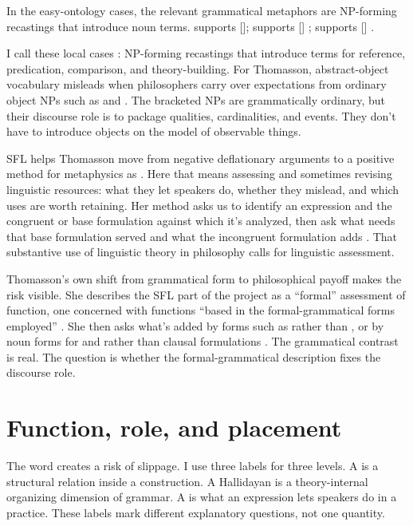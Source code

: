 \documentclass[12pt]{article}
\begin{document}
In the easy-ontology cases, the relevant grammatical metaphors are NP-forming recastings that introduce noun terms.  supports  [];  supports [] ;  supports []  \citep[169--179]{thomasson2025rethink}.

I call these local cases : NP-forming recastings that introduce terms for reference, predication, comparison, and theory-building. For Thomasson, abstract-object vocabulary misleads when philosophers carry over expectations from ordinary object NPs such as  and . The bracketed NPs are grammatically ordinary, but their discourse role is to package qualities, cardinalities, and events. They don't have to introduce objects on the model of observable things.

SFL helps Thomasson move from negative deflationary arguments to a positive method for metaphysics as . Here that means assessing and sometimes revising linguistic resources: what they let speakers do, whether they mislead, and which uses are worth retaining. Her method asks us to identify an expression and the congruent or base formulation against which it's analyzed, then ask what needs that base formulation served and what the incongruent formulation adds \citep[203--207]{thomasson2025rethink}. That substantive use of linguistic theory in philosophy calls for linguistic assessment.

Thomasson's own shift from grammatical form to philosophical payoff makes the risk visible. She describes the SFL part of the project as a \enquote{formal} assessment of function, one concerned with functions \enquote{based in the formal-grammatical forms employed} \citep[206]{thomasson2025rethink}. She then asks what's added by forms such as  rather than , or by noun forms for  and  rather than clausal formulations \citep[206--207]{thomasson2025rethink}. The grammatical contrast is real. The question is whether the formal-grammatical description fixes the discourse role.

\section{Function, role, and placement}
The word  creates a risk of slippage. I use three labels for three levels. A  is a structural relation inside a construction. A Hallidayan  is a theory-internal organizing dimension of grammar. A  is what an expression lets speakers do in a practice. These labels mark different explanatory questions, not one quantity.
\end{document}
